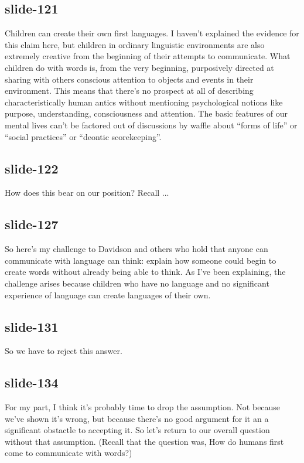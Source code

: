 \documentclass[12pt,\papersize]{extarticle}
\begin{document}
 
\subsection{slide-121}
Children can create their own first languages.
I haven't explained the evidence for this claim here, but children in ordinary linguistic environments are also extremely creative from the beginning of their attempts to communicate.
What children do with words is, from the very beginning, purposively directed at sharing with others conscious attention to objects and events in their environment.
This means that there's no prospect at all of describing characteristically human antics without mentioning psychological notions like purpose, understanding, consciousness and attention.
The basic features of our mental lives can't be factored out of discussions by waffle about “forms of life” or “social practices” or “deontic scorekeeping”.
 
 
\subsection{slide-122}
How does this bear on our position? Recall ...
 
 
\subsection{slide-127}
So here's my challenge to Davidson and others who hold that anyone can communicate with language can think:
explain how someone could begin to create words without already being able to think.
As I've been explaining, the challenge arises because children who have no language and no significant experience of language can create languages of their own.
 
 
\subsection{slide-131}
So we have to reject this answer.
 
 
\subsection{slide-134}
For my part, I think it's probably time to drop the assumption.
Not because we've shown it's wrong, but because there's no good argument for it an a significant obstactle to accepting it.
So let's return to our overall question without that assumption.
(Recall that the question was, How do humans first come to communicate with words?)
 
\end{document}
